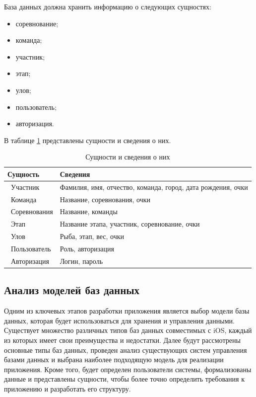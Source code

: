 База данных должна хранить информацию о следующих сущностях:

\begin{itemize}[label=---]
	\item соревнование;
	\item команда;
	\item участник;
	\item этап;
	\item улов;
	\item пользователь;
	\item авторизация.
\end{itemize}

В таблице \ref{decisions} представлены сущности и сведения о них.

\begin{table}[ht!]
	\centering
	\caption{Сущности и сведения о них}
	\label{decisions}
	\begin{tabular}{|p{4.3cm}|p{10.3cm}|}
		\hline
		\textbf{Сущность} & \textbf{Сведения}\\
		\hline 
		\ Участник & Фамилия, имя, отчество, команда, город, дата рождения, очки \\
		\hline 
		\ Команда & Название, соревнования, очки \\
		\hline 
		\ Соревнования & Название, команды \\
		\hline 
		\ Этап & Название этапа, участник, соревнование, очки \\
		\hline 
		\ Улов & Рыба, этап, вес, очки \\
		\hline 
		\ Пользователь & Роль, авторизация  \\
		\hline 
		\ Авторизация & Логин, пароль \\
		\hline
	\end{tabular}
\end{table}

\subsection{Анализ моделей баз данных}

Одним из ключевых этапов разработки приложения является выбор модели базы данных, которая будет использоваться для хранения и управления данными. Существует множество различных типов баз данных  совместимых с iOS, каждый из которых имеет свои преимущества и недостатки. Далее будут рассмотрены основные типы баз данных, проведен анализ существующих систем управления базами данных и выбрана наиболее подходящую модель для реализации приложения. Кроме того, будет определен пользователи системы, формализованы данные и представлены сущности, чтобы более точно определить требования к приложению и разработать его структуру.

